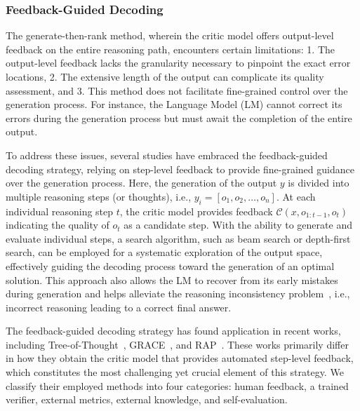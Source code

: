 \documentclass[12pt]{extarticle}
\begin{document}
\subsubsection{Feedback-Guided Decoding}
The generate-then-rank method, wherein the critic model offers output-level feedback on the entire reasoning path, encounters certain limitations: 1. The output-level feedback lacks the granularity necessary to pinpoint the exact error locations, 2. The extensive length of the output can complicate its quality assessment, and 3. This method does not facilitate fine-grained control over the generation process. For instance, the Language Model (LM) cannot correct its errors during the generation process but must await the completion of the entire output.

To address these issues, several studies have embraced the feedback-guided decoding strategy, relying on step-level feedback to provide fine-grained guidance over the generation process. Here, the generation of the output $y$ is divided into multiple reasoning steps (or thoughts), i.e., $y_{i}=\left[o_{1}, o_{2}, \ldots, o_{n}\right]$. At each individual reasoning step $t$, the critic model provides feedback $\mathcal{C}\left(x, o_{1: t-1}, o_{t}\right)$ indicating the quality of $o_{t}$ as a candidate step. With the ability to generate and evaluate individual steps, a search algorithm, such as beam search or depth-first search, can be employed for a systematic exploration of the output space, effectively guiding the decoding process toward the generation of an optimal solution. This approach also allows the LM to recover from its early mistakes during generation and helps alleviate the reasoning inconsistency problem~\cite{zelikman2022star, creswell2022faithful}, i.e., incorrect reasoning leading to a correct final answer.

The feedback-guided decoding strategy has found application in recent works, including Tree-of-Thought~\cite{yao2023tree}, GRACE~\cite{khalifa2023grace}, and RAP~\cite{hao2023reasoning}. These works primarily differ in how they obtain the critic model that provides automated step-level feedback, which constitutes the most challenging yet crucial element of this strategy. We classify their employed methods into four categories: human feedback, a trained verifier, external metrics, external knowledge, and self-evaluation.
\end{document}

